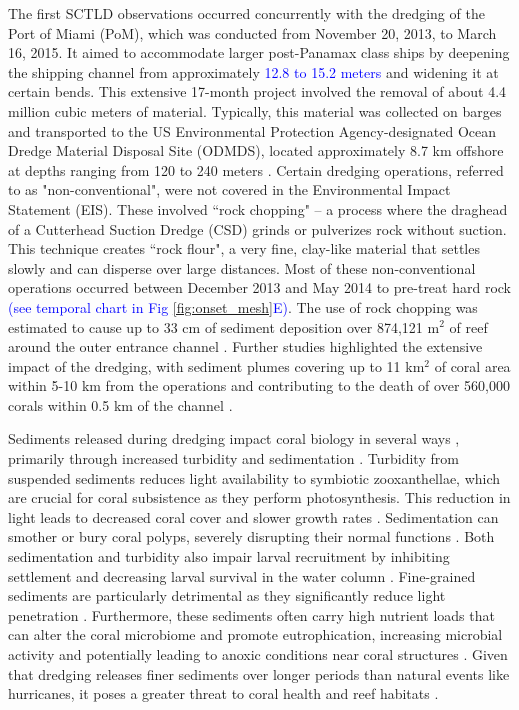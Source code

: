 \documentclass[preprint,12pt,authoryear]{elsarticle}
\newcommand{\modif}[1]{\textcolor{blue}{#1}}
\begin{document}
The first SCTLD observations occurred concurrently with the dredging of the Port of Miami (PoM), which was conducted from November 20, 2013, to March 16, 2015. It aimed to accommodate larger post-Panamax class ships by deepening the shipping channel from approximately \modif{12.8 to 15.2 meters} and widening it at certain bends. This extensive 17-month project involved the removal of about 4.4 million cubic meters of material. Typically, this material was collected on barges and transported to the US Environmental Protection Agency-designated Ocean Dredge Material Disposal Site (ODMDS), located approximately 8.7 km offshore at depths ranging from 120 to 240 meters \citep{noaa2023sedimentation}. Certain dredging operations, referred to as "non-conventional", were not covered in the Environmental Impact Statement (EIS). These involved ``rock chopping" -- a process where the draghead of a Cutterhead Suction Dredge (CSD) grinds or pulverizes rock without suction. This technique creates ``rock flour", a very fine, clay-like material that settles slowly and can disperse over large distances. Most of these non-conventional operations occurred between December 2013 and May 2014 to pre-treat hard rock \modif{(see temporal chart in Fig \ref{fig:onset_mesh}E)}. The use of rock chopping was estimated to cause up to 33 cm of sediment deposition over 874,121 m$^2$ of reef around the outer entrance channel \citep{usace2017}. Further studies highlighted the extensive impact of the dredging, with sediment plumes covering up to 11 km$^2$ of coral area within 5-10 km from the operations \citep{barnes2015sediment} and contributing to the death of over 560,000 corals within 0.5 km of the channel \citep{cunning2019extensive}.

Sediments released during dredging impact coral biology in several ways \citep{fabricius2005effects}, primarily through increased turbidity and sedimentation \citep{erftemeijer2012environmental,jones2015effects}. Turbidity from suspended sediments reduces light availability to symbiotic zooxanthellae, which are crucial for coral subsistence as they perform photosynthesis. This reduction in light leads to decreased coral cover and slower growth rates \citep{kendall1983effects, rogers1990responses, anthony1999tank, hennige2008photoacclimation}. Sedimentation can smother or bury coral polyps, severely disrupting their normal functions \citep{erftemeijer2012environmental, jones2015effects, jones2019sediment}. Both sedimentation and turbidity also impair larval recruitment by inhibiting settlement and decreasing larval survival in the water column \citep{jones2015effects}. Fine-grained sediments are particularly detrimental as they significantly reduce light penetration \citep{storlazzi2015influence, fourney2017additive}. Furthermore, these sediments often carry high nutrient loads that can alter the coral microbiome and promote eutrophication, increasing microbial activity and potentially leading to anoxic conditions near coral structures \citep{rosales2019oceanographic, wittenberg1992effects, weber2012mechanisms}. Given that dredging releases finer sediments over longer periods than natural events like hurricanes, it poses a greater threat to coral health and reef habitats \citep{cunning2019extensive}.
\end{document}
